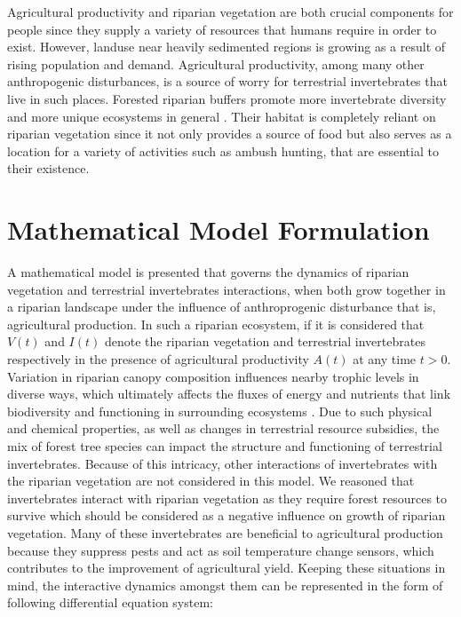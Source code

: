 \documentclass[12pt]{article}
\numberwithin{equation}{section}
\begin{document}
 Agricultural productivity and riparian vegetation are both crucial components for people since they supply a variety of resources that humans require in order to exist. However, landuse near heavily sedimented regions is growing as a result of rising population and demand. Agricultural productivity, among many other anthropogenic disturbances, is a source of worry for terrestrial invertebrates that live in such places. Forested riparian buffers promote more invertebrate diversity and more unique ecosystems in general \cite{popescu2021riparian}. Their habitat is completely reliant on riparian vegetation since it not only provides a source of food but also serves as a location for a variety of activities such as ambush hunting, that are essential to their existence.
\vspace{-1cm}
\section{Mathematical Model Formulation}
A mathematical model is presented that governs the dynamics of riparian vegetation and terrestrial invertebrates interactions, when both grow together in a riparian landscape under the influence of anthroprogenic disturbance that is, agricultural production. In such a riparian ecosystem, if it is considered that $V(t)$ and $I(t)$ denote the riparian vegetation and terrestrial invertebrates respectively in the presence of agricultural productivity $A(t)$ at any time $t>0$. Variation in riparian canopy composition influences nearby trophic levels in diverse ways, which ultimately affects the fluxes of energy and nutrients that link biodiversity and functioning in surrounding ecosystems \cite{kominoski2011}. Due to such physical and chemical properties, as well as changes in terrestrial resource subsidies, the mix of forest tree species can impact the structure and functioning of terrestrial invertebrates. Because of this intricacy, other interactions of invertebrates with the riparian vegetation are not considered in this model. We reasoned that invertebrates interact with riparian vegetation as they require forest resources to survive which should be considered as a negative influence on growth of riparian vegetation. Many of these invertebrates are beneficial to agricultural production because they suppress pests and act as soil temperature change sensors, which contributes to the improvement of agricultural yield. Keeping these situations in mind, the interactive dynamics amongst them can be represented in the form of following differential equation system:
\end{document}
